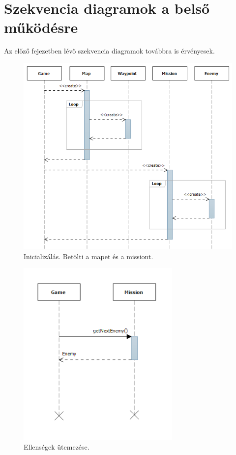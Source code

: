 \section{Szekvencia diagramok a belső működésre}
Az előző fejezetben lévő szekvencia diagramok továbbra is érvényesek. \\
\begin{figure}[H]
\begin{center}
\includegraphics[width=15cm]{images/ch04/init.png}
\caption{Inicializálás. Betölti a mapet és a missiont.}
\label{fig:starting_game}
\end{center}
\end{figure}

\begin{figure}[H]
\begin{center}
\includegraphics[width=8cm]{images/scheduling_enemies.png}
\caption{Ellenségek ütemezése.}
\label{fig:scheduling_enemies}
\end{center}
\end{figure}


